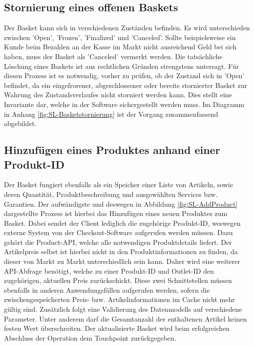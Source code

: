 \subsection{Stornierung eines offenen Baskets}

Der Basket kann sich in verschiedenen Zuständen befinden. Es wird unterschieden zwischen 'Open', 'Frozen', 'Finalized' und 'Canceled'. Sollte beispielsweise ein Kunde beim Bezahlen an der Kasse im Markt nicht ausreichend Geld bei sich haben, muss der Basket als 'Canceled' vermerkt werden. Die tatsächliche Löschung eines Baskets ist aus rechtlichen Gründen strengstens untersagt. Für diesen Prozess ist es notwendig, vorher zu prüfen, ob der Zustand sich in 'Open' befindet, da ein eingefrorener, abgeschlossener oder bereits stornierter Basket zur Wahrung des Zustandsverlaufes nicht storniert werden kann. Dies stellt eine Invariante dar, welche in der Software sichergestellt werden muss. Im Diagramm in Anhang \ref{fig:SL-Basketstornierung} ist der Vorgang zusammenfassend abgebildet.


\subsection{Hinzufügen eines Produktes anhand einer Produkt-ID}

Der Basket fungiert ebenfalls als ein Speicher einer Liste von Artikeln, sowie deren Quantität, Produktbeschreibung und ausgewählten Services bzw. Garantien. Der aufwändigste und deswegen in Abbildung \ref{fig:SL-AddProduct} dargestellte Prozess ist hierbei das Hinzufügen eines neuen Produktes zum Basket. Dabei sendet der Client lediglich die zugehörige Produkt-ID, weswegen externe System von der Checkout-Software aufgerufen werden müssen. Dazu gehört die Product-API, welche alle notwendigen Produktdetails liefert. Der Artikelpreis selbst ist hierbei nicht in den Produktinformationen zu finden, da dieser von Markt zu Markt unterschiedlich sein kann. Daher wird eine weiterer API-Abfrage benötigt, welche zu einer Produkt-ID und Outlet-ID den zugehörigen, aktuellen Preis zurückschickt. Diese zwei Schnittstellen müssen ebenfalls in anderen Anwendungsfällen aufgerufen werden, sofern die zwischengespeicherten Preis- bzw. Artikelinformationen im Cache nicht mehr gültig sind. Zusätzlich folgt eine Validierung des Datenmodells auf verschiedene Parameter. Unter anderem darf die Gesamtanzahl der enthaltenen Artikel keinen festen Wert überschreiten. Der aktualisierte Basket wird beim erfolgreichen Abschluss der Operation dem Touchpoint zurückgegeben.

